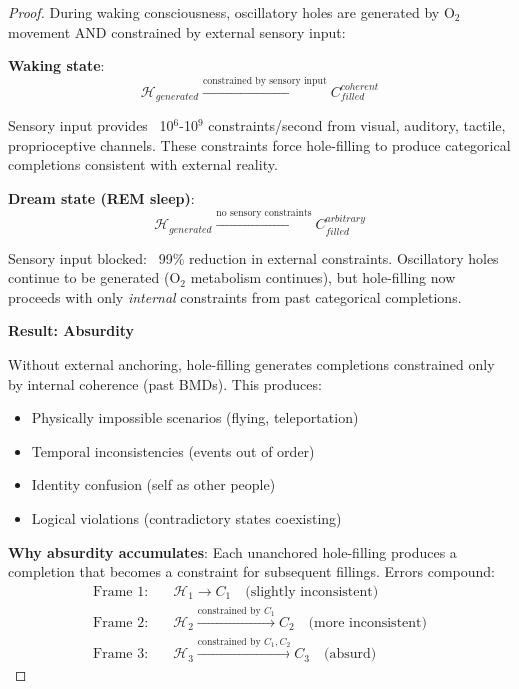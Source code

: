 \documentclass[11pt,a4paper]{article}
\begin{document}
\begin{proof}
During waking consciousness, oscillatory holes are generated by O$_2$ movement AND constrained by external sensory input:

\textbf{Waking state}:
\begin{equation}
\mathcal{H}_{generated} \xrightarrow{\text{constrained by sensory input}} C_{filled}^{coherent}
\end{equation}

Sensory input provides ~10$^6$-10$^9$ constraints/second from visual, auditory, tactile, proprioceptive channels. These constraints force hole-filling to produce categorical completions consistent with external reality.

\textbf{Dream state (REM sleep)}:
\begin{equation}
\mathcal{H}_{generated} \xrightarrow{\text{no sensory constraints}} C_{filled}^{arbitrary}
\end{equation}

Sensory input blocked: ~99\% reduction in external constraints. Oscillatory holes continue to be generated (O$_2$ metabolism continues), but hole-filling now proceeds with only \textit{internal} constraints from past categorical completions.

\textbf{Result: Absurdity}

Without external anchoring, hole-filling generates completions constrained only by internal coherence (past BMDs). This produces:
\begin{itemize}
\item Physically impossible scenarios (flying, teleportation)
\item Temporal inconsistencies (events out of order)
\item Identity confusion (self as other people)
\item Logical violations (contradictory states coexisting)
\end{itemize}

\textbf{Why absurdity accumulates}: Each unanchored hole-filling produces a completion that becomes a constraint for subsequent fillings. Errors compound:
\begin{align}
\text{Frame 1:} \quad &\mathcal{H}_1 \to C_1 \quad \text{(slightly inconsistent)} \\
\text{Frame 2:} \quad &\mathcal{H}_2 \xrightarrow{\text{constrained by } C_1} C_2 \quad \text{(more inconsistent)} \\
\text{Frame 3:} \quad &\mathcal{H}_3 \xrightarrow{\text{constrained by } C_1, C_2} C_3 \quad \text{(absurd)}
\end{align}


\end{proof}
\end{document}
